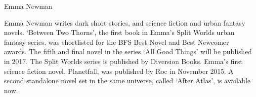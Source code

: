 {\Large Emma Newman}

\begin{figure}
	\vspace{-10mm}
	\vspace{-10mm}
\end{figure}

Emma Newman writes dark short stories, and science fiction and urban fantasy novels. `Between Two Thorns', the first book in Emma's Split Worlds urban fantasy series, was shortlisted for the BFS Best Novel and Best Newcomer awards. The fifth and final novel in the series `All Good Things' will be published in 2017. The Split Worlds series is published by Diversion Books. Emma's first science fiction novel, Planetfall, was published by Roc in November 2015. A second standalone novel set in the same universe, called `After Atlas', is available now.